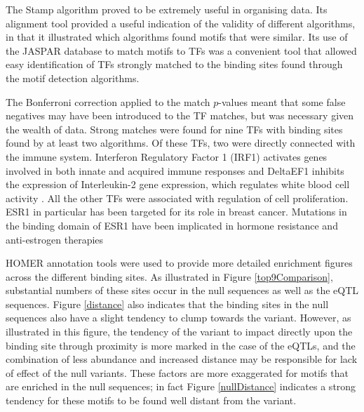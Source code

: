 \documentclass[12pt]{article}
\begin{document}
The Stamp algorithm proved to be extremely useful in organising data. Its alignment tool provided a useful indication of the validity of different algorithms, in that it illustrated which algorithms found motifs that were similar. Its use of the JASPAR database to match motifs to TFs was a convenient tool that allowed easy identification of TFs strongly matched to the binding sites found through the motif detection algorithms.

The Bonferroni correction applied to the match $p$-values meant that some false negatives may have been introduced to the TF matches, but was necessary given the wealth of data. Strong matches were found for nine TFs with binding sites found by at least two algorithms. Of these TFs, two were directly connected with the immune system. Interferon Regulatory Factor 1 (IRF1) activates genes involved in both innate and acquired immune responses and DeltaEF1 inhibits the expression of Interleukin-2 gene expression, which regulates white blood cell activity \citep{Weizmann2018}. All the other TFs were associated with regulation of cell proliferation. ESR1 in particular has been targeted for its role in breast cancer. Mutations in the binding domain of ESR1 have been implicated in hormone resistance and anti-estrogen therapies \citep{Griffith2017}

HOMER annotation tools were used to provide more detailed enrichment figures across the different binding sites. As illustrated in Figure \ref{top9Comparison}, substantial numbers of these sites occur in the null sequences as well as the eQTL sequences. Figure \ref{distance} also indicates that the binding sites in the null sequences also have a slight tendency to clump towards the variant. However, as illustrated in this figure, the tendency of the variant to impact directly upon the binding site through proximity is more marked in the case of the eQTLs, and the combination of less abundance and increased distance may be responsible for lack of effect of the null variants. These factors are more exaggerated for motifs that are enriched in the null sequences; in fact Figure \ref{nullDistance} indicates a strong tendency for these motifs to be found well distant from the variant. 
\end{document}
